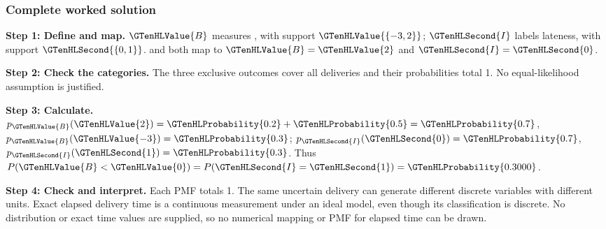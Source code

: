 \subsubsection*{Complete worked solution}
\par\noindent\begin{minipage}{\linewidth}
\textbf{Step 1: Define and map.} $\GTenHLValue{B}$ measures , with support $\GTenHLValue{\{-3,2\}}$; $\GTenHLSecond{I}$ labels lateness, with support $\GTenHLSecond{\{0,1\}}$.  and  both map to $\GTenHLValue{B}=\GTenHLValue{2}$ and $\GTenHLSecond{I}=\GTenHLSecond{0}$.
\end{minipage}\par\medskip
\par\noindent\begin{minipage}{\linewidth}
\textbf{Step 2: Check the categories.} The three exclusive outcomes cover all deliveries and their probabilities total 1. No equal-likelihood assumption is justified.
\end{minipage}\par\medskip
\par\noindent\begin{minipage}{\linewidth}
\textbf{Step 3: Calculate.} $p_{\GTenHLValue{B}}(\GTenHLValue{2})=\GTenHLProbability{0.2}+\GTenHLProbability{0.5}=\GTenHLProbability{0.7}$, $p_{\GTenHLValue{B}}(\GTenHLValue{-3})=\GTenHLProbability{0.3}$; $p_{\GTenHLSecond{I}}(\GTenHLSecond{0})=\GTenHLProbability{0.7}$, $p_{\GTenHLSecond{I}}(\GTenHLSecond{1})=\GTenHLProbability{0.3}$. Thus $P(\GTenHLValue{B}<\GTenHLValue{0})=P(\GTenHLSecond{I}=\GTenHLSecond{1})=\GTenHLProbability{0.3000}$.
\end{minipage}\par\medskip
\par\noindent\begin{minipage}{\linewidth}
\textbf{Step 4: Check and interpret.} Each PMF totals 1. The same uncertain delivery can generate different discrete variables with different units. Exact elapsed delivery time is a continuous measurement under an ideal model, even though its  classification is discrete. No distribution or exact time values are supplied, so no numerical mapping or PMF for elapsed time can be drawn.
\end{minipage}\par\medskip
\Needspace{6.8cm}

